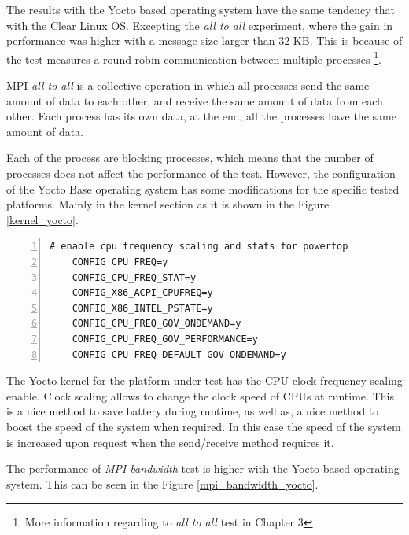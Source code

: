 The results with the Yocto based operating system have the same
tendency that with the Clear Linux OS. Excepting  the \textit{all to all}
experiment, where the gain in performance was higher with a message size
larger than 32 KB. This is because of the test measures a round-robin communication 
between multiple processes \footnote{More information regarding to \textit{all
to all} test in Chapter 3}.

MPI \textit{all to all} is a collective operation in which all processes send
the same amount of data to each other, and receive the same amount of data from
each other. Each process has its own data, at the end, all the processes have
the same amount of data. 

Each of the process are blocking processes, which means that the number of
processes does not affect the performance of the test. However,
the configuration of the Yocto Base operating system has 
some modifications for the specific tested platforms. Mainly in the
kernel section as it is shown in the Figure \ref{kernel_yocto}.

\begin{minipage}{\textwidth}
\end{minipage}

\begin{minipage}{\textwidth}
\begin{lstlisting}[frame=single,numbers=left]
    # enable cpu frequency scaling and stats for powertop
    CONFIG_CPU_FREQ=y
    CONFIG_CPU_FREQ_STAT=y
    CONFIG_X86_ACPI_CPUFREQ=y
    CONFIG_X86_INTEL_PSTATE=y
    CONFIG_CPU_FREQ_GOV_ONDEMAND=y
    CONFIG_CPU_FREQ_GOV_PERFORMANCE=y
    CONFIG_CPU_FREQ_DEFAULT_GOV_ONDEMAND=y
\end{lstlisting}
\label{kernel_yocto} 
\end{minipage}

\begin{minipage}{\textwidth}
\end{minipage}

The Yocto kernel for the platform under test has the CPU clock frequency
scaling enable. Clock scaling allows to change the clock speed of CPUs at
runtime. This is a nice method to save battery during runtime, as well as, a
nice method to boost the speed of the system when required. In this case the
speed of the system is increased upon request when the send/receive method
requires it.


The performance of \textit{MPI bandwidth} test is higher with the Yocto based
operating system. This can be seen in the Figure \ref{mpi_bandwidth_yocto}.

